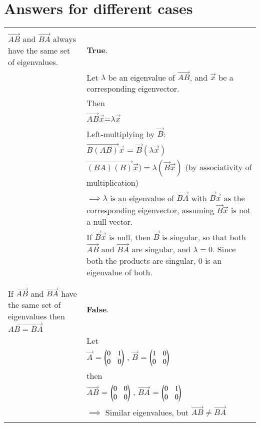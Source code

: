 \documentclass[journal,12pt,twocolumn]{IEEEtran}
\newcommand\myemptypage{
	\null
	\thispagestyle{empty}
	\addtocounter{page}{-1}
	\newpage
}
\begin{document}
\section{Answers for different cases}
\pagebreak
\myemptypage
\begin{table}[h]
	\begin{tabular}{|m{3cm}|m{14cm}|}
		\hline
		&\\
		$\vec{AB}$ and $\vec{BA}$ always have the same set of eigenvalues.
		& \textbf{True}. \\
		& Let  $\lambda$  be an eigenvalue of  $\vec{AB}$, and $\vec{x}$  be a corresponding eigenvector.\\
		&Then \\
		& \qquad\qquad\qquad$\vec{AB} \vec{x}$=$\lambda \vec{x}$ \\
		& Left-multiplying by $\vec{B}$:\\
		&\qquad\qquad\qquad$\vec{B(AB)}\vec{x}$ = $\vec{B}(\lambda \vec{x})$\\
		& \qquad\qquad\qquad$\vec{(BA)(B)}\vec{x})=\lambda(\vec{B}\vec{x})$  (by associativity of multiplication)\\
	    & $\implies  \lambda $ is an eigenvalue of  $\vec{BA}$  with  $\vec{B}\vec{x}$  as the corresponding eigenvector, assuming  $\vec{B}\vec{x}$  is not a null vector.\\
		&If  $\vec{B}\vec{x}$   is null, then  $\vec{B}$   is singular, so that both  $\vec{AB}$ and  $\vec{BA}$ are singular, and  $\lambda=0$. Since both the products are singular,  0  is an eigenvalue of both.\\
		& \\
		\hline
		&\\
		If $\vec{AB}$ and $\vec{BA}$ have the same set of eigenvalues then $\vec{AB=BA}$
		& \textbf{False}. \\
		& Let\\
		& \qquad\qquad\qquad$\vec{A}$ = $\begin{pmatrix}0 & 1 \\ 0 & 0\end{pmatrix}$ , 
	     $\vec{B}$ = $\begin{pmatrix}1 & 0 \\ 0 & 0\end{pmatrix}$\\
	    &then\\
	    & \qquad\qquad\qquad$\vec{AB}$ = $\begin{pmatrix}0 & 0 \\ 0 & 0\end{pmatrix}$ ,  $\vec{BA}$ = $\begin{pmatrix}0 & 1 \\ 0 & 0\end{pmatrix}$\\
        & $\implies$ Similar eigenvalues, but $\vec{AB} \ne \vec{BA}$
		\\
		&\\

\end{tabular}
\end{table}
\end{document}
